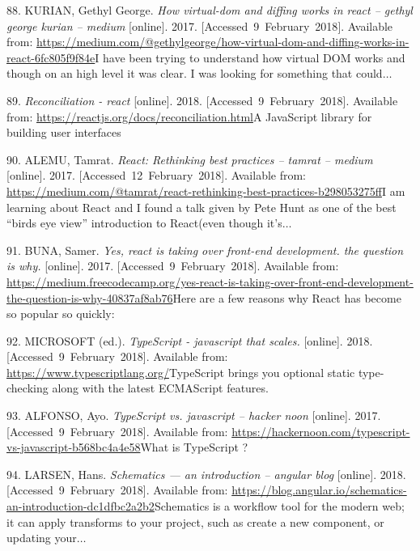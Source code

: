 \documentclass[american,a4paper,oneside,,tablecaptionabove]{scrbook}
\begin{document}
\hypertarget{ref-Kurian.2017}{}
88. KURIAN, Gethyl George. \emph{How virtual-dom and diffing works in
react -- gethyl george kurian -- medium} {[}online{]}. 2017.
{[}Accessed~9~February~2018{]}. Available from:
\url{https://medium.com/@gethylgeorge/how-virtual-dom-and-diffing-works-in-react-6fc805f9f84e}I
have been trying to understand how virtual DOM works and though on an
high level it was clear. I was looking for something that
could\(\ldots\)

\hypertarget{ref-Facebook.2018c}{}
89. \emph{Reconciliation - react} {[}online{]}. 2018.
{[}Accessed~9~February~2018{]}. Available from:
\url{https://reactjs.org/docs/reconciliation.html}A JavaScript library
for building user interfaces

\hypertarget{ref-Alemu.2017}{}
90. ALEMU, Tamrat. \emph{React: Rethinking best practices -- tamrat --
medium} {[}online{]}. 2017. {[}Accessed~12~February~2018{]}. Available
from:
\url{https://medium.com/@tamrat/react-rethinking-best-practices-b298053275ff}I
am learning about React and I found a talk given by Pete Hunt as one of
the best ``birds eye view'' introduction to React(even though
it's\(\ldots\)

\hypertarget{ref-Buna.2017}{}
91. BUNA, Samer. \emph{Yes, react is taking over front-end development.
the question is why.} {[}online{]}. 2017.
{[}Accessed~9~February~2018{]}. Available from:
\url{https://medium.freecodecamp.org/yes-react-is-taking-over-front-end-development-the-question-is-why-40837af8ab76}Here
are a few reasons why React has become so popular so quickly:

\hypertarget{ref-Microsoft.2018}{}
92. MICROSOFT (ed.). \emph{TypeScript - javascript that scales.}
{[}online{]}. 2018. {[}Accessed~9~February~2018{]}. Available from:
\url{https://www.typescriptlang.org/}TypeScript brings you optional
static type-checking along with the latest ECMAScript features.

\hypertarget{ref-Alfonso.2017}{}
93. ALFONSO, Ayo. \emph{TypeScript vs. javascript -- hacker noon}
{[}online{]}. 2017. {[}Accessed~9~February~2018{]}. Available from:
\url{https://hackernoon.com/typescript-vs-javascript-b568bc4a4e58}What
is TypeScript ?

\hypertarget{ref-Larsen.2018}{}
94. LARSEN, Hans. \emph{Schematics --- an introduction -- angular blog}
{[}online{]}. 2018. {[}Accessed~9~February~2018{]}. Available from:
\url{https://blog.angular.io/schematics-an-introduction-dc1dfbc2a2b2}Schematics
is a workflow tool for the modern web; it can apply transforms to your
project, such as create a new component, or updating your\(\ldots\)
\end{document}
